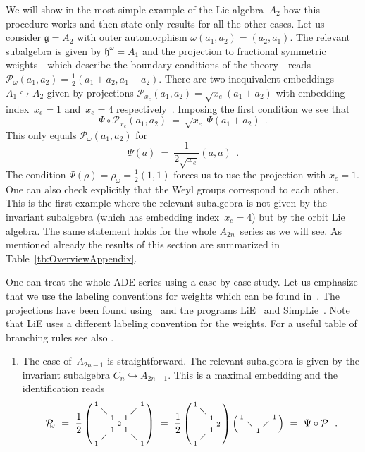 \documentclass[12pt,a4paper]{article}
\newcommand{\proj}{\mc{P}_{\!\!\omega}}
\newcommand{\embin}{{\hookrightarrow}}
\newcommand{\smat}{\begin{smallmatrix}}
\newcommand{\stam}{\end{smallmatrix}}
\newcommand{\mf}{\mathfrak} %
\newcommand{\mc}{\mathcal} %
\def\Iso{\Psi}
\def\sg{\mf{h}^\omega} %
\begin{document}
\begin{appendix}
We will show in the most simple example of the Lie algebra~$A_2$
how this procedure works and then state only results for all the 
other cases. Let us consider $\mf{g}=A_2$ with outer automorphism
$\omega(a_1,a_2)=(a_2,a_1)$. The relevant subalgebra is given 
by $\sg=A_1$ and the projection to fractional symmetric weights 
- which describe the boundary conditions of the theory - reads 
$\mc{P}_{\omega}(a_1,a_2)=\frac{1}{2}(a_1+a_2,a_1+a_2)$. There 
are two inequivalent embeddings $A_1\hookrightarrow A_2$ given by
projections $\mc{P}_{x_e}(a_1,a_2)=\sqrt{x_e}(a_1+a_2)$ with embedding 
index~$x_e=1$ and~$x_e=4$ respectively~\cite[p.~534]{FrancescoCFT}.
Imposing the first condition we see that
\begin{equation}
  \Iso\circ\mc{P}_{x_e}(a_1,a_2)
 \  =\ \sqrt{x_e}\:\Iso(a_1+a_2)\ \ .
\end{equation}
This only equals $\mc{P}_{\omega}(a_1,a_2)$ for
\begin{equation}
  \Iso(a)\ =\ \frac{1}{2\sqrt{x_e}}(a,a)\ \ .
\end{equation}
The condition $\Iso(\rho)=\rho_\omega=\frac{1}{2}(1,1)$ forces
us to use the projection with $x_e=1$. One can also check explicitly that 
the Weyl groups correspond to each other. This is the first example
where the relevant subalgebra is not given by the invariant subalgebra
(which has embedding index~$x_e=4$) but by the orbit Lie algebra. The 
same statement holds for the whole $A_{2n}$~series as we will see. As 
mentioned already the results of this section are summarized in 
Table~\ref{tb:OverviewAppendix}.
\smallskip

One can  treat the whole ADE series using a case by case study. Let us
emphasize that we use the labeling conventions for weights which can 
be found in~\cite[p.~540]{FrancescoCFT}. The projections have been 
found using~\cite[p.~57-61]{McKayPateraRand:1990} and the programs 
LiE~\cite{LiE} and SimpLie~\cite{SimpLie}. Note that LiE uses a 
different labeling convention for the weights. For a useful table of 
branching rules see also \cite{McKayPatera:1981}.
\begin{enumerate}
\item The case of~$A_{2n-1}$ is straightforward. The relevant subalgebra
is given by the invariant subalgebra $C_n\embin A_{2n-1}$. This is a
maximal embedding and the identification reads
\[
  \proj
  \ =\ \frac{1}{2}\left(\smat1&&&&&&1\\&\diagdown&&&&\diagup
  \\&&1&&1&&\\&&&2\\&&1&&1&&\\&\diagup&&&&\diagdown\\1&&&&&&1\stam\right)
  \ =\ \frac{1}{2}\left(\smat1&\\&\diagdown\\&&1\\&&&2\\&&1\\&\diagup
  \\1\stam\right)\left(\smat1&&&&1\\&\diagdown&&\diagup\\&&1\stam\right)
  \ =\ \Iso\circ\mc{P}\ \ .
\]


\end{enumerate}
\end{appendix}
\end{document}
